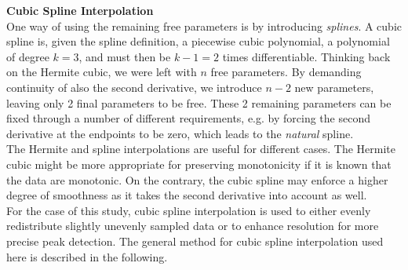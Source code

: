 \documentclass[../../CompleteThesis2/Complete_2ndDraft.tex]{subfiles}
\begin{document}
	\indent \textbf{Cubic Spline Interpolation}\\
	One way of using the remaining free parameters is by introducing \textit{splines}. A cubic spline is, given the spline definition, a piecewise cubic polynomial, a polynomial of degree $k=3$, and must then be $k-1 = 2$ times differentiable. Thinking back on the Hermite cubic, we were left with $n$ free parameters. By demanding continuity of also the second derivative, we introduce $n-2$ new parameters, leaving only 2 final parameters to be free. These 2 remaining parameters can be fixed through a number of different requirements, e.g. by forcing the second derivative at the endpoints to be zero, which leads to the \textit{natural} spline.\\
	The Hermite and spline interpolations are useful for different cases. The Hermite cubic might be more appropriate for preserving monotonicity if it is known that the data are monotonic. On the contrary, the cubic spline may enforce a higher degree of smoothness as it takes the second derivative into account as well.\\
	For the case of this study, cubic spline interpolation is used to either evenly redistribute slightly unevenly sampled data or to enhance resolution for more precise peak detection. The general method for cubic spline interpolation used here is described in the following.
	
\end{document}
